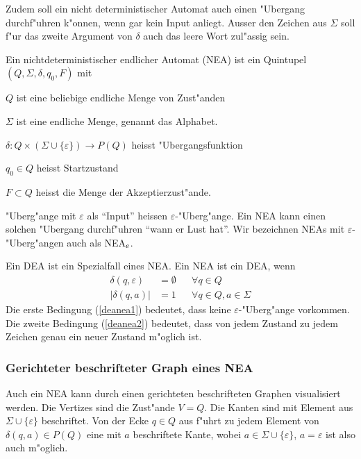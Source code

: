 Zudem soll ein
nicht deterministischer Automat auch einen "Ubergang durchf"uhren
k"onnen, wenn gar kein Input anliegt.
Ausser den Zeichen aus $\Sigma$ soll f"ur das zweite Argument
von $\delta$ auch das leere Wort zul"assig sein.

\begin{definition}\label{definition_nea}
Ein nichtdeterministischer endlicher Automat (NEA) ist ein Quintupel
$(Q,\Sigma,\delta, q_0,F)$ mit
\begin{compactenum}
\item $Q$ ist eine beliebige endliche Menge von Zust"anden
\item $\Sigma$ ist eine endliche Menge, genannt das Alphabet.
\item $\delta\colon Q\times(\Sigma\cup\{\varepsilon\})\to P(Q)$ heisst "Ubergangsfunktion
\item $q_0\in Q$ heisst Startzustand
\item $F\subset Q$ heisst die Menge der Akzeptierzust"ande.
\end{compactenum}
\end{definition}
"Uberg"ange mit $\varepsilon$ als ``Input'' heissen $\varepsilon$-"Uberg"ange.
Ein NEA kann einen solchen "Ubergang durchf"uhren ``wann er Lust hat''.
Wir bezeichnen NEAs mit $\varepsilon$-"Uberg"angen auch als
NEA$\mathstrut_\varepsilon$.

Ein DEA ist ein Spezialfall eines NEA. Ein NEA ist
ein DEA, wenn
\begin{align}
\delta(q,\varepsilon)&=\emptyset&&\forall q\in Q\label{deanea1}\\
|\delta(q,a)|&=1&&\forall q\in Q, a\in\Sigma\label{deanea2}
\end{align}
Die erste Bedingung (\ref{deanea1}) bedeutet, dass keine
$\varepsilon$-"Uberg"ange vorkommen. Die zweite Bedingung (\ref{deanea2})
bedeutet, dass von jedem Zustand zu jedem Zeichen genau ein
neuer Zustand m"oglich ist.

\subsubsection{Gerichteter beschrifteter Graph eines NEA}
Auch ein NEA kann durch einen gerichteten beschrifteten Graphen
visualisiert werden. Die Vertizes sind die Zust"ande $V=Q$. Die
Kanten sind mit Element aus $\Sigma\cup\{\varepsilon\}$ beschriftet.
Von der Ecke $q\in Q$ aus f"uhrt zu jedem Element von $\delta(q,a)\in P(Q)$
eine mit $a$ beschriftete Kante, wobei $a\in \Sigma\cup\{\varepsilon\}$, $a=\varepsilon$ ist also auch m"oglich.

